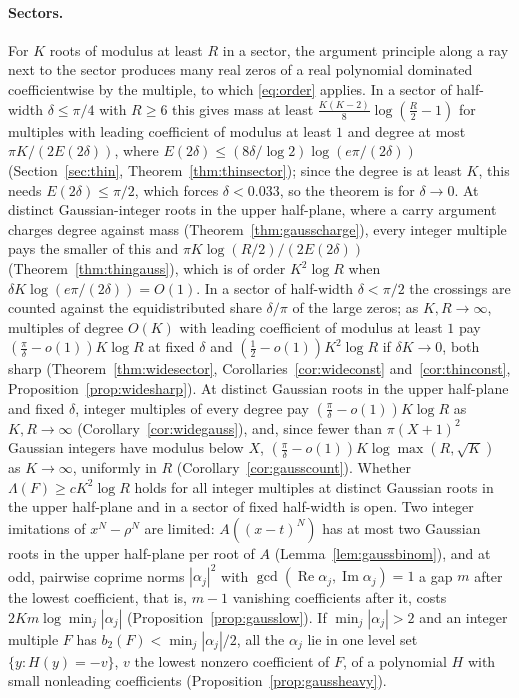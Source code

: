 \documentclass[11pt]{article}
\begin{document}
\paragraph{Sectors.}  For $K$ roots of modulus at least $R$ in a sector, the
argument principle along a ray next to the sector produces many real zeros
of a real polynomial dominated coefficientwise by the multiple, to which
\eqref{eq:order} applies.  In a sector of half-width $\delta\le\pi/4$ with
$R\ge6$ this
gives mass at least $\frac{K(K-2)}8\log(\frac R2-1)$ for multiples with
leading coefficient of modulus at least $1$ and degree at most
$\pi K/(2E(2\delta))$, where
$E(2\delta)\le(8\delta/\log2)\log(e\pi/(2\delta))$ (Section~\ref{sec:thin},
Theorem~\ref{thm:thinsector}); since the degree is at least $K$, this
needs $E(2\delta)\le\pi/2$, which forces $\delta<0.033$, so the theorem is
for $\delta\to0$.  At distinct Gaussian-integer roots in the
upper half-plane, where a carry
argument charges degree against mass (Theorem~\ref{thm:gausscharge}), every
integer multiple pays the smaller of this and
$\pi K\log(R/2)/(2E(2\delta))$ (Theorem~\ref{thm:thingauss}), which is of
order $K^2\log R$ when $\delta K\log(e\pi/(2\delta))=O(1)$.  In a sector of
half-width $\delta<\pi/2$ the crossings
are counted against the equidistributed share $\delta/\pi$ of the
large zeros; as $K,R\to\infty$, multiples of degree $O(K)$ with leading coefficient of modulus at least $1$ pay
$(\frac\pi\delta-o(1))K\log R$ at fixed $\delta$ and $(\frac12-o(1))K^2\log R$
if $\delta K\to0$, both sharp (Theorem~\ref{thm:widesector},
Corollaries~\ref{cor:wideconst} and~\ref{cor:thinconst},
Proposition~\ref{prop:widesharp}).  At distinct Gaussian roots in the upper
half-plane and fixed $\delta$, integer multiples of every degree pay
$(\frac\pi\delta-o(1))K\log R$ as $K,R\to\infty$
(Corollary~\ref{cor:widegauss}), and, since fewer than $\pi(X+1)^2$ Gaussian
integers have modulus below $X$, $(\frac\pi\delta-o(1))K\log\max(R,\sqrt K)$
as $K\to\infty$, uniformly in $R$ (Corollary~\ref{cor:gausscount}).  Whether
$\Lambda(F)\ge cK^2\log R$ holds for all integer multiples at distinct Gaussian roots
in the upper half-plane and in a sector of fixed half-width is open.  Two integer imitations of $x^N-\rho^N$ are
limited: $A((x-t)^N)$ has at most two Gaussian roots in the upper
half-plane per root of $A$ (Lemma~\ref{lem:gaussbinom}), and at odd,
pairwise coprime norms $|\alpha_j|^2$ with
$\gcd(\operatorname{Re}\alpha_j,\operatorname{Im}\alpha_j)=1$ a gap $m$ after
the lowest coefficient, that is, $m-1$ vanishing coefficients after it,
costs $2Km\log\min_j|\alpha_j|$
(Proposition~\ref{prop:gausslow}).  If $\min_j|\alpha_j|>2$ and an integer
multiple $F$ has $b_2(F)<\min_j|\alpha_j|/2$, all the $\alpha_j$ lie in one level set
$\{y:H(y)=-v\}$, $v$ the lowest nonzero coefficient of $F$, of a polynomial
$H$ with small nonleading coefficients
(Proposition~\ref{prop:gaussheavy}).
\end{document}
